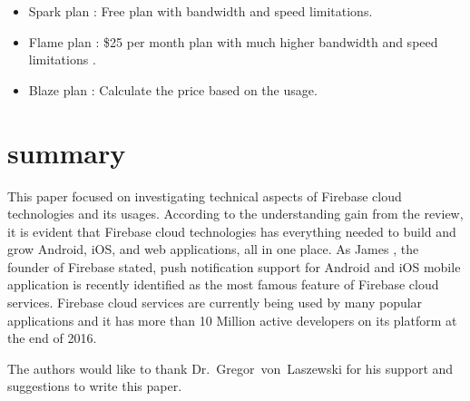 \begin{itemize} \item Spark plan : Free plan with bandwidth and speed
	limitations. \item Flame plan : \$25 per month plan with much higher 
	bandwidth
	and speed limitations . \item Blaze plan : Calculate the price based on the
	usage. \end{itemize}

\section{summary} This paper focused on investigating technical aspects of
Firebase cloud technologies and its usages. According to the understanding gain
from the review, it is evident that Firebase cloud technologies has everything
needed to build and grow Android, iOS, and web applications, all in one place.
As James \cite{hid-sp18-409-www-firebase}, the founder of Firebase stated, push
notification support for Android and iOS mobile application is recently
identified as the most famous feature of Firebase cloud services. Firebase cloud
services are currently being used by many popular applications and it has more
than 10 Million active developers on its platform  at the end of
2016\cite{hid-sp18-409-www-firebase}.

\begin{acks}
	
	The authors would like to thank Dr.~Gregor~von~Laszewski for his support and
	suggestions to write this paper.
	
\end{acks}


 

